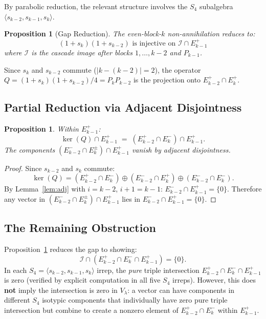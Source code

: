 \documentclass[11pt]{article}
\newtheorem{proposition}[theorem]{Proposition}
\theoremstyle{definition}
\theoremstyle{remark}
\begin{document}
By parabolic reduction, the relevant structure involves the $S_4$
subalgebra $\langle s_{k-2}, s_{k-1}, s_k \rangle$.

\begin{proposition}[Gap Reduction]
The even-block-$k$ non-annihilation reduces to:
\[
(1+s_k)(1+s_{k-2}) \text{ is injective on } \mathcal{I} \cap E_{k-1}^+
\]
where $\mathcal{I}$ is the cascade image after blocks $1, \ldots, k{-}2$
and $P_{k-1}$.
\end{proposition}

Since $s_k$ and $s_{k-2}$ commute ($|k - (k{-}2)| = 2$), the operator
$Q = (1+s_k)(1+s_{k-2})/4 = P_k P_{k-2}$ is the projection onto
$E_{k-2}^+ \cap E_k^+$.

\subsection{Partial Reduction via Adjacent Disjointness}

\begin{proposition}\label{prop:partial}
Within $E_{k-1}^+$:
\[
\ker(Q) \cap E_{k-1}^+ \;=\; (E_{k-2}^+ \cap E_k^-) \cap E_{k-1}^+.
\]
The components $(E_{k-2}^- \cap E_k^{\pm}) \cap E_{k-1}^+$ vanish
by adjacent disjointness.
\end{proposition}

\begin{proof}
Since $s_{k-2}$ and $s_k$ commute:
\[
\ker(Q) = (E_{k-2}^+ \cap E_k^-) \oplus (E_{k-2}^- \cap E_k^+)
\oplus (E_{k-2}^- \cap E_k^-).
\]
By Lemma~\ref{lem:adj} with $i = k{-}2$, $i{+}1 = k{-}1$:
$E_{k-2}^- \cap E_{k-1}^+ = \{0\}$.
Therefore any vector in $(E_{k-2}^- \cap E_k^{\pm}) \cap E_{k-1}^+$
lies in $E_{k-2}^- \cap E_{k-1}^+ = \{0\}$.
\end{proof}

\subsection{The Remaining Obstruction}

Proposition~\ref{prop:partial} reduces the gap to showing:
\[
\mathcal{I} \cap (E_{k-2}^+ \cap E_k^- \cap E_{k-1}^+) = \{0\}.
\]
In each $S_4 = \langle s_{k-2}, s_{k-1}, s_k \rangle$ irrep,
the \emph{pure} triple intersection $E_{k-2}^+ \cap E_k^- \cap E_{k-1}^+$
is zero (verified by explicit computation in all five $S_4$ irreps).
However, this does \textbf{not} imply the intersection is zero in $V_\lambda$:
a vector can have components in different $S_4$ isotypic components that
individually have zero pure triple intersection but combine to create a
nonzero element of $E_{k-2}^+ \cap E_k^-$ within $E_{k-1}^+$.
\end{document}
